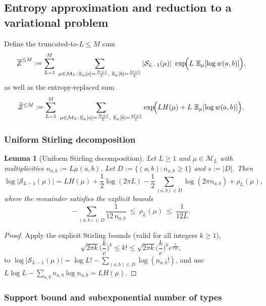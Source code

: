 \documentclass[11pt]{amsart}
\numberwithin{equation}{section}
\numberwithin{equation}{section}
\newcommand{\1}{\mathbbm{1}}
\newcommand{\calS}{\mathcal{S}}
\newcommand{\E}{\mathbb{E}}
\newtheorem{lemma}[theorem]{Lemma}
\theoremstyle{definition}
\begin{document}
\subsection{Entropy approximation and reduction to a variational problem}

Define the truncated-to-$L\le M$ sum
\begin{equation}\label{eq:Z-by-type-leM}
\overline{Z}^{\le M}
:=\sum_{L=1}^{M}\
\sum_{\mu\in\mathcal{M}_L:\, \E_\mu[a]=\frac{N+1}{L},\ \E_\mu[b]=\frac{M+1}{L}}
|\calS_{L-1}(\mu)|\ \exp\!\Bigl(L\ \E_{\mu}[\log w(a,b)]\Bigr),
\end{equation}
as well as the entropy-replaced sum
\begin{equation}\label{eq:Z-by-type-tilde}
\widetilde{Z}^{\le M}
:=\sum_{L=1}^{M}\
\sum_{\mu\in\mathcal{M}_L:\, \E_\mu[a]=\frac{N+1}{L},\ \E_\mu[b]=\frac{M+1}{L}}
\exp\!\Bigl(L H(\mu)+L\ \E_{\mu}[\log w(a,b)]\Bigr).
\end{equation}

\subsubsection{Uniform Stirling decomposition}

\begin{lemma}[Uniform Stirling decomposition]\label{lem:stirling-uniform}
Let $L\ge 1$ and $\mu\in\mathcal M_L$ with multiplicities $n_{a,b}:=L\mu(a,b)$.
Let $D:=\{(a,b):n_{a,b}\ge 1\}$ and $s:=|D|$.
Then
\begin{equation}\label{eq:stirling-decomp}
\log|\calS_{L-1}(\mu)|
= L H(\mu)
+\frac12\log(2\pi L)-\frac12\sum_{(a,b)\in D}\log(2\pi n_{a,b})
+\rho_L(\mu),
\end{equation}
where the remainder satisfies the explicit bounds
\begin{equation}\label{eq:rho-bounds}
-\sum_{(a,b)\in D}\frac{1}{12\,n_{a,b}}
\ \le\ \rho_L(\mu)\ \le\ \frac{1}{12L}.
\end{equation}
\end{lemma}

\begin{proof}
Apply the explicit Stirling bounds (valid for all integers $k\ge 1$),
\[
\sqrt{2\pi k}\Big(\frac{k}{e}\Big)^k \le k! \le
\sqrt{2\pi k}\Big(\frac{k}{e}\Big)^k e^{\frac{1}{12k}},
\]
to $\log|\calS_{L-1}(\mu)|=\log L!-\sum_{(a,b)\in D}\log(n_{a,b}!)$, and use
$L\log L-\sum_{a,b}n_{a,b}\log n_{a,b}=L H(\mu)$.
\end{proof}

\subsubsection{Support bound and subexponential number of types}
\end{document}
